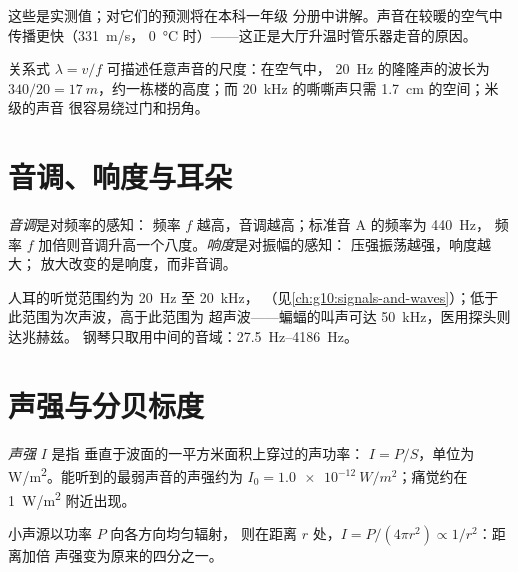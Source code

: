 \begin{remark}[暖空气中声速更快]\label{rem:g12:sound-acoustics:temperature}
这些是实测值；对它们的预测将在本科一年级
分册中讲解。声音在较暖的空气中传播更快（\qty{331}{m/s}，
\qty{0}{\degreeCelsius} 时）——这正是大厅升温时管乐器走音的原因。
\end{remark}

\begin{example}[声波的尺度]\label{ex:g12:sound-acoustics:wavelengths}
关系式 $\lambda = v/f$ 可描述任意声音的尺度：在空气中，
\qty{20}{Hz} 的隆隆声的波长为 $340/20 = \qty{17}{m}$，约一栋楼的高度；而
\qty{20}{kHz} 的嘶嘶声只需 \qty{1.7}{cm} 的空间；米级的声音
很容易绕过门和拐角。
\end{example}

\section{音调、响度与耳朵}

\begin{definition}[音调与响度]\label{def:g12:sound-acoustics:pitch-loudness}
\emph{音调}是对频率的感知：
频率 $f$ 越高，音调越高；标准音 A 的频率为 \qty{440}{Hz}，
频率 $f$ 加倍则音调升高一个八度。\emph{响度}是对振幅的感知：
压强振荡越强，响度越大；
放大改变的是响度，而非音调。
\end{definition}

\begin{remark}[人耳的听觉范围]\label{rem:g12:sound-acoustics:audible}
人耳的听觉范围约为 \qty{20}{Hz} 至 \qty{20}{kHz}，
（见\cref{ch:g10:signals-and-waves}）；低于此范围为次声波，高于此范围为
超声波——蝙蝠的叫声可达 \qty{50}{kHz}，医用探头则达兆赫兹。
钢琴只取用中间的音域：\qtyrange{27.5}{4186}{Hz}。
\end{remark}

\section{声强与分贝标度}

\begin{definition}[声强]\label{def:g12:sound-acoustics:intensity}
\emph{声强} $I$ 是指
垂直于波面的一平方米面积上穿过的声功率：
$I = P/S$，单位为 \unit{W/m^2}。能听到的最弱声音的声强约为
$I_0 = \qty{1.0e-12}{W/m^2}$；痛觉约在 \qty{1}{W/m^2} 附近出现。
\end{definition}

\begin{proposition}[平方反比衰减]\label{prop:g12:sound-acoustics:inverse-square}
%
小声源以功率 $P$ 向各方向均匀辐射，
则在距离 $r$ 处，$I = P/(4\pi r^2) \propto 1/r^2$：距离加倍
声强变为原来的四分之一。
\end{proposition}

